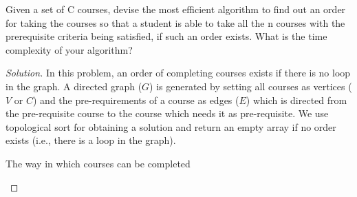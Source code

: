 \begin{solution}{2.1}
    \begin{question}
        Given a set of C courses, devise the most efficient algorithm to find out an order for taking the courses so that a student is able to take all the n courses with the prerequisite criteria being satisfied, if such an order exists. What is the time complexity of your algorithm?
    \end{question}
    \tcblower{}
    
    \begin{proof}[Solution]
        In this problem, an order of completing courses exists if there is no loop in the graph. A directed graph ($G$) is generated by setting all courses as vertices ($V$ or $C$) and the pre-requirements of a course as edges ($E$) which is directed from the pre-requisite course to the course which needs it as pre-requisite. We use topological sort for obtaining a solution and return an empty array if no order exists (i.e., there is a loop in the graph).
        \begin{algorithm}[H]
            \caption{The way in which courses can be completed}\label{alg:topo}
            \begin{algorithmic}
                 
                 
                       
                         
                    \EndIf{}
                \EndFor{}
                \Else{}
                \State{\Return{$[]$}}
                \EndIf{}
            \EndProcedure{}
            \end{algorithmic}
        \end{algorithm}
        

\end{proof}
\end{solution}
